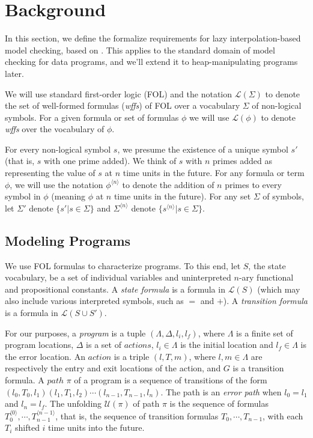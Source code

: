 \section{Background}
\label{sec:background}

In this section, we define the formalize requirements for lazy interpolation-based model checking, based on \cite{mcmillan06}. This applies to the standard domain of model checking for data programs, and we'll extend it to heap-manipulating programs later.

We will use standard first-order logic (FOL) and the notation $\mathcal{L}(\Sigma)$ to denote the set of well-formed formulas (\textit{wffs}) of FOL over a vocabulary $\Sigma$ of non-logical symbols. For a given formula or set of formulas $\phi$ we will use $\mathcal{L}(\phi)$ to denote \textit{wffs} over the vocabulary of $\phi$.

For every non-logical symbol $s$, we presume the existence of a unique symbol $s'$ (that is, $s$ with one prime added). We think of $s$ with $n$ primes added as representing the value of $s$ at $n$ time units in the future. For any formula or term $\phi$, we will use the notation $\phi^{\langle n \rangle}$ to denote the addition of $n$ primes to every symbol in $\phi$ (meaning $\phi$ at $n$ time units in the future). For any set $\Sigma$ of symbols, let $\Sigma'$ denote $\{ s' | s \in \Sigma \}$ and $\Sigma^{\langle n \rangle}$ denote $\{ s^{\langle n \rangle} | s \in \Sigma \}$.

\subsection{Modeling Programs}

We use FOL formulas to characterize programs. To this end, let $S$, the state vocabulary, be a set of individual variables and uninterpreted $n$-ary functional and propositional constants. A \textit{state formula} is a formula in $\mathcal{L}(S)$ (which may also include various interpreted symbols, such as $=$ and $+$). A \textit{transition formula} is a formula in $\mathcal{L}(S \cup S')$.

For our purposes, a \textit{program} is a tuple $(\Lambda, \Delta, l_i, l_f)$, where $\Lambda$ is a finite set of program locations, $\Delta$ is a set of $actions$, $l_i \in \Lambda$ is the initial location and $l_f \in \Lambda$ is the error location. An $action$ is a triple $(l, T, m)$, where $l,m \in \Lambda$ are respectively the entry and exit locations of the action, and $G$ is a transition formula. A $path$ $\pi$ of a program is a sequence of transitions of the form $(l_0, T_0, l_1)(l_1, T_1, l_2) \cdots (l_{n-1}, T_{n-1}, l_n)$. The path is an \textit{error path} when $l_0 = l_1$ and $l_n = l_f$. The unfolding $\mathcal{U}(\pi)$ of path $\pi$ is the sequence of formulas $T_0^{\langle 0 \rangle}, \cdots, T_{n-1}^{\langle n-1 \rangle}$, that is, the sequence of transition formulas $T_0, \cdots, T_{n-1}$, with each $T_i$ shifted $i$ time units into the future.

